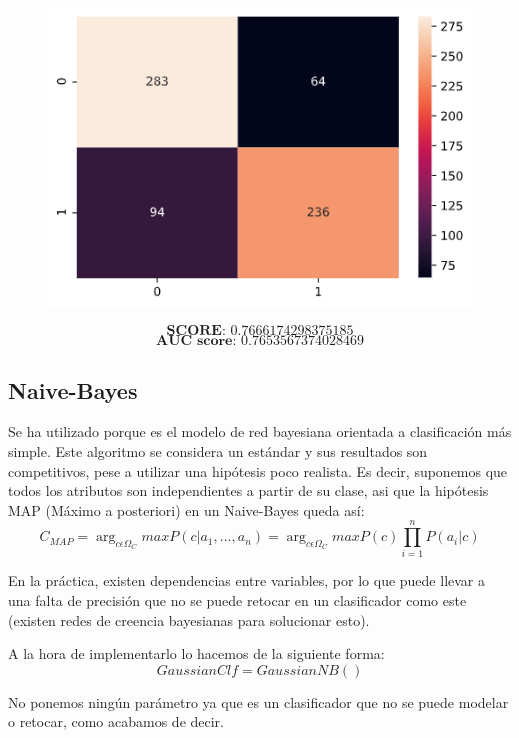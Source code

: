 \documentclass[11pt,a4paper]{article}
\begin{document}
\begin{figure}[H]
    \centering
    \includegraphics[scale=0.5]{img/matrix-tree.png}    
\end{figure}
$$\textbf{SCORE:  } 0.7666174298375185$$
$$\textbf{AUC score:  } 0.7653567374028469$$


\subsection{Naive-Bayes}
Se ha utilizado porque es el modelo de red bayesiana orientada a clasificación más simple. Este algoritmo se considera un
estándar y sus resultados son competitivos, pese a utilizar una hipótesis poco realista. Es decir, suponemos que todos los
atributos son independientes a partir de su clase, asi que la hipótesis MAP (Máximo a posteriori) en un Naive-Bayes queda así:
$$C_{MAP} = \arg _{c\epsilon \Omega_C}maxP(c|a_1,...,a_n) = \arg _{c\epsilon \Omega_C}maxP(c)\prod_{i=1}^{n}P(a_i|c)$$

En la práctica, existen dependencias entre variables, por lo que puede llevar a una falta de precisión que no se puede retocar
en un clasificador como este (existen redes de creencia bayesianas para solucionar esto).

A la hora de implementarlo lo hacemos de la siguiente forma:
$$GaussianClf = GaussianNB()$$

No ponemos ningún parámetro ya que es un clasificador que no se puede modelar o retocar, como acabamos de decir.
\end{document}
